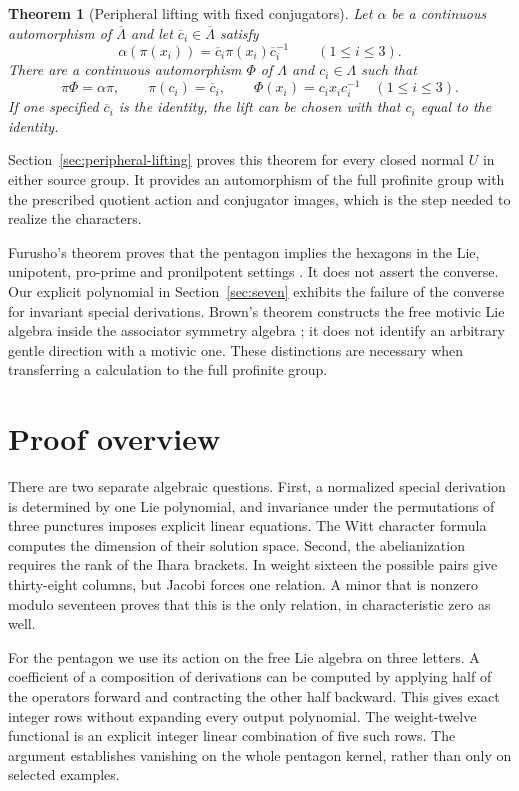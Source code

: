 \documentclass[11pt]{article}
\newtheorem{theorem}{Theorem}[section]
\theoremstyle{definition}
\theoremstyle{remark}
\begin{document}
\begin{theorem}[Peripheral lifting with fixed conjugators]
\label{thm:main-peripheral-lifting}
Let $\alpha$ be a continuous automorphism of $\overline\Lambda$ and
let $\overline c_i\in\overline\Lambda$ satisfy
\[
 \alpha(\pi(x_i))=\overline c_i\pi(x_i)\overline c_i^{-1}
 \qquad(1\leq i\leq3).
\]
There are a continuous automorphism $\Phi$ of $\Lambda$ and
$c_i\in\Lambda$ such that
\[
 \pi\Phi=\alpha\pi,\qquad \pi(c_i)=\overline c_i,\qquad
 \Phi(x_i)=c_ix_ic_i^{-1}\quad(1\leq i\leq3).
\]
If one specified $\overline c_i$ is the identity, the lift can be
chosen with that $c_i$ equal to the identity.
\end{theorem}

Section~\ref{sec:peripheral-lifting} proves this theorem for every
closed normal $U$ in either source group. It provides an automorphism
of the full profinite group with the prescribed quotient action and
conjugator images, which is the step needed to realize the characters.

Furusho's theorem proves that the pentagon implies the hexagons in the
Lie, unipotent, pro-prime and pronilpotent settings
\cite[Theorems 1--3 and the two corollaries in \S3]{Furusho}.
It does not assert the converse.
Our explicit polynomial in Section~\ref{sec:seven} exhibits the failure
of the converse for invariant special derivations.  Brown's theorem
constructs the free motivic Lie algebra inside the associator symmetry
algebra \cite[Theorem 1.1 and its consequence, \S1.1]{Brown}; it does not identify an arbitrary gentle
direction with a motivic one.  These distinctions are necessary when
transferring a calculation to the full profinite group.

\section{Proof overview}
There are two separate algebraic questions.  First, a normalized special
derivation is determined by one Lie polynomial, and invariance under the
permutations of three punctures imposes explicit linear equations.  The
Witt character formula computes the dimension of their solution space.
Second, the abelianization requires the rank of the Ihara brackets.  In
weight sixteen the possible pairs give thirty-eight columns, but Jacobi
forces one relation.  A minor that is nonzero modulo seventeen proves
that this is the only relation, in characteristic zero as well.

For the pentagon we use its action on the free Lie algebra on three
letters.  A coefficient of a composition of derivations can be computed
by applying half of the operators forward and contracting the other half
backward.  This gives exact integer rows without expanding every output
polynomial.  The weight-twelve functional is an explicit integer linear
combination of five such rows.  The argument establishes vanishing on
the whole pentagon kernel, rather than only on selected examples.
\end{document}
